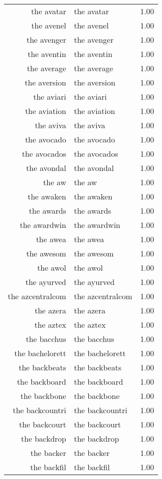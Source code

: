 \begin{table}[ht]
\begin{tabular}{rlr}
  the avatar & the avatar & 1.00 \\ 
  the avenel & the avenel & 1.00 \\ 
  the avenger & the avenger & 1.00 \\ 
  the aventin & the aventin & 1.00 \\ 
  the average & the average & 1.00 \\ 
  the aversion & the aversion & 1.00 \\ 
  the aviari & the aviari & 1.00 \\ 
  the aviation & the aviation & 1.00 \\ 
  the aviva & the aviva & 1.00 \\ 
  the avocado & the avocado & 1.00 \\ 
  the avocados & the avocados & 1.00 \\ 
  the avondal & the avondal & 1.00 \\ 
  the aw & the aw & 1.00 \\ 
  the awaken & the awaken & 1.00 \\ 
  the awards & the awards & 1.00 \\ 
  the awardwin & the awardwin & 1.00 \\ 
  the awea & the awea & 1.00 \\ 
  the awesom & the awesom & 1.00 \\ 
  the awol & the awol & 1.00 \\ 
  the ayurved & the ayurved & 1.00 \\ 
  the azcentralcom & the azcentralcom & 1.00 \\ 
  the azera & the azera & 1.00 \\ 
  the aztex & the aztex & 1.00 \\ 
  the bacchus & the bacchus & 1.00 \\ 
  the bachelorett & the bachelorett & 1.00 \\ 
  the backbeats & the backbeats & 1.00 \\ 
  the backboard & the backboard & 1.00 \\ 
  the backbone & the backbone & 1.00 \\ 
  the backcountri & the backcountri & 1.00 \\ 
  the backcourt & the backcourt & 1.00 \\ 
  the backdrop & the backdrop & 1.00 \\ 
  the backer & the backer & 1.00 \\ 
  the backfil & the backfil & 1.00 \\ 

\end{tabular}
\end{table}
